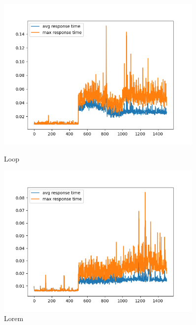 \begin{figure}[h]
    \begin{minipage}[t]{0.5\textwidth}
        \centering
        \includegraphics[width=0.9\textwidth]{../sample_results/loop/hpa/response-time-hpa-hpa.png}
        \caption{Loop}
    \end{minipage}
    \hfill
    \begin{minipage}[t]{0.5\textwidth}
        \centering
        \includegraphics[width=0.9\textwidth]{../sample_results/lorem/hpa/response-time-hpa-hpa.png}
        \caption{Lorem}
    \end{minipage}
\end{figure}

